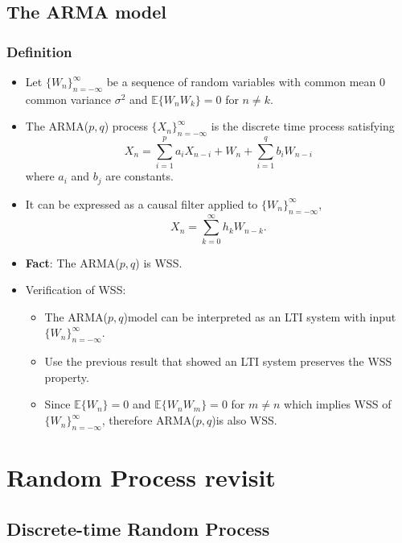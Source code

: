\documentclass[12pt]{article}
\newcommand{\sigd}{\sigma^2}
\newcommand{\mexpproc}[1]{\mathbb{E}\{ #1\}}
\newcommand{\summ}[2]{\sum_{#1}^{#2}}
\newcommand{\sumkzeroinf}{\summ{k=0}{\infty}}
\newcommand{\arproc}[1]{$\{#1_n \}_{n=-\infty}^{\infty}$}
\newcommand{\arma}{ARMA($p,q$)}
\begin{document}
\subsection{The ARMA model}
\subsubsection{Definition}
\begin{itemize}
    \item Let \arproc{W} be a sequence of random variables with common mean 0 common variance $\sigd$ and $\mexpproc{W_nW_k}=0$ for $n\not = k$.
    \item The ARMA($p,q$) process \arproc{X} is the discrete time process satisfying 
    \[
    X_n = \summ{i=1}{p}a_i X_{n-i} + W_n + \summ{i=1}{q}b_i W_{n-i}
    \]
    where $a_i$ and $b_j$ are constants.
    \item It can be expressed as a causal filter applied to \arproc{W},
    \[
    X_n = \sumkzeroinf h_k W_{n-k}.
    \]
    \item \textbf{Fact}: The ARMA($p,q$) is WSS.
    \item Verification of WSS:
    \begin{itemize}
    \item The \arma model can be interpreted as an LTI system with input \arproc{W}.
    \item Use the previous result that showed an LTI system preserves the WSS property.
    \item Since $\mexpproc{W_n}=0$ and $\mexpproc{W_n W_m} = 0$ for $m\not = n$ which implies WSS of \arproc{W}, therefore \arma is also WSS.
    \end{itemize}
\end{itemize}

\section{Random Process revisit }
\subsection{Discrete-time Random Process}
\end{document}
